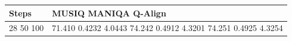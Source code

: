 \begin{tabular}{ll}
\toprule
Steps & MUSIQ MANIQA Q-Align \\
\midrule
28 50 100 & 71.410 0.4232 4.0443 74.242 0.4912 4.3201 74.251 0.4925 4.3254 \\
\bottomrule
\end{tabular}
